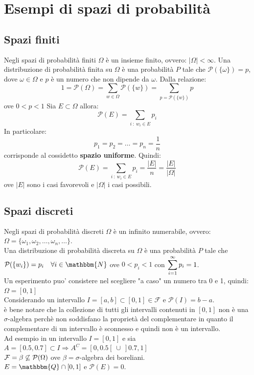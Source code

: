 \documentclass[12pt]{report}
\begin{document}
	\section{Esempi di spazi di probabilità}
	\subsection{Spazi finiti}
	Negli spazi di probabilità finiti $\Omega$ è un insieme finito, ovvero: $|\Omega| < \infty$.
	Una distribuzione di probabilità finita su $\Omega$ è una probabilità $P$ tale che $\mathcal{P}(\{\omega\}) = p$, dove $\omega \in \Omega$ e $p$ è un numero che non dipende da $\omega$. Dalla relazione:
	\[
	1 = \mathcal{P}(\Omega) = \sum_{w \in \Omega}\mathcal{P}(\{w\}) = \sum_{p = \mathcal{P}(\{w\})}p
	\]
	ove $0 < p < 1$
	Sia $E \subset \Omega$ allora:
	\[
	\mathcal{P}(E) = \sum_{i\ :\ w_i \in E}p_i
	\]
	In particolare:
	\[
	p_1 = p_2 = \dots = p_n = \frac{1}{n}
	\]
	corrisponde al cossidetto \textbf{spazio uniforme}.
	Quindi:
	\[
	\mathcal{P}(E) = \sum_{i\ :\ w_i \in E}p_i = \frac{|E|}{n} = \frac{|E|}{|\Omega|}
	\]
	ove $|E|$ sono i casi favorevoli e $|\Omega|$ i casi possibili.
	\subsection{Spazi discreti}
	Negli spazi di probabilità discreti $\Omega$ è un infinito numerabile, ovvero: $\Omega = \{\omega_1, \omega_2, \dots, \omega_n, \dots\}$. \\
	Una distribuzione di probabilità discreta su $\Omega$ è una probabilità $P$ tale che $\mathcal{P}(\{w_i\}) = p_i \quad \forall i \in \mathbbm{N}$ ove $0 < p_i < 1$ con $\mathlarger{\sum_{i=1}^{\infty}p_i = 1}$. \\
	Un esperimento puo' consistere nel scegliere "a caso" un numero tra 0 e 1, quindi:\\
	$\Omega = [0, 1]$ \\
	Considerando un intervallo $I = [a, b] \subset [0, 1] \in \mathcal{F}$ e $\mathcal{P}(I) = b - a$. \\
	è bene notare che la collezione di tutti gli intervalli contenuti in $[0, 1]$ non è una $\sigma$-algebra perchè non soddisfano la proprietà del complementare in quanto il complementare di un intervallo è sconnesso e quindi non è un intervallo.
	\\
	Ad esempio in un intervallo $I = [0, 1]$ e sia $A = [0.5, 0.7] \subset I \Rightarrow A^C = [0, 0.5[\ \cup\ ]0.7, 1]$ \\
	$\mathcal{F}=\beta \centernot{\subseteq} \mathcal{P}(\Omega)$ ove $\beta=\sigma$-algebra dei boreliani.\\
	$E = \mathbbm{Q} \cap [0, 1]$ e $\mathcal{P}(E) = 0$.
\end{document}
